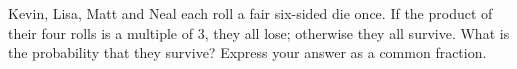 Kevin, Lisa, Matt and Neal each roll a fair six-sided die once. If the product of their four rolls is a multiple of $3$, they all lose; otherwise they all survive. What is the probability that they survive? Express your answer as a common fraction.
